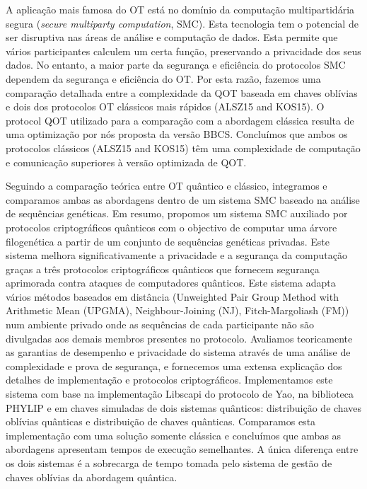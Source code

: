 \documentclass[12pt]{report}
\begin{document}
A aplicação mais famosa do OT está no domínio da computação multipartidária segura (\textit{secure multiparty computation}, SMC). Esta tecnologia tem o potencial de ser disruptiva nas áreas de análise e computação de dados. Esta permite que vários participantes calculem um certa função, preservando a privacidade dos seus dados. No entanto, a maior parte da segurança e eficiência do protocolos SMC dependem da segurança e eficiência do OT.  Por esta razão, fazemos uma comparação detalhada entre a complexidade da QOT baseada em chaves oblívias e dois dos protocolos OT clássicos mais rápidos (ALSZ15 and KOS15). O protocol QOT utilizado para a comparação com a abordagem clássica resulta de uma optimização por nós proposta da versão BBCS. Concluímos que ambos os protocolos clássicos (ALSZ15 and KOS15) têm uma complexidade de computação e comunicação superiores à versão optimizada de QOT.

Seguindo a comparação teórica entre OT quântico e clássico, integramos e comparamos ambas as abordagens dentro de um sistema SMC baseado na análise de sequências genéticas. Em resumo, propomos um sistema SMC auxiliado por protocolos criptográficos quânticos com o objectivo de computar uma árvore filogenética a partir de um conjunto de sequências genéticas privadas. Este sistema melhora significativamente a privacidade e a segurança da computação graças a três protocolos criptográficos quânticos que fornecem segurança aprimorada contra ataques de computadores quânticos. Este sistema adapta vários métodos baseados em distância (Unweighted Pair Group Method with Arithmetic Mean (UPGMA), Neighbour-Joining (NJ), Fitch-Margoliash (FM)) num ambiente privado onde as sequências de cada participante não são divulgadas aos demais membros presentes no protocolo. Avaliamos teoricamente as garantias de desempenho e privacidade do sistema através de uma análise de complexidade e prova de segurança, e fornecemos uma extensa explicação dos detalhes de implementação e protocolos criptográficos. Implementamos este sistema com base na implementação Libscapi do protocolo de Yao, na biblioteca PHYLIP e em chaves simuladas de dois sistemas quânticos: distribuição de chaves oblívias quânticas e distribuição de chaves quânticas. Comparamos esta implementação com uma solução somente clássica e concluímos que ambas as abordagens apresentam tempos de execução semelhantes. A única diferença entre os dois sistemas é a sobrecarga de tempo tomada pelo sistema de gestão de chaves oblívias da abordagem quântica.
\end{document}
